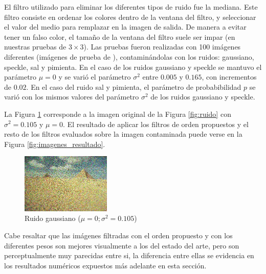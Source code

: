El filtro utilizado para eliminar los diferentes tipos de ruido fue la mediana. Este filtro consiste en ordenar los colores dentro de la ventana del filtro, y seleccionar el valor del medio para remplazar en la imagen de salida. De manera a evitar tener un falso color, el tama\~no de la ventana del filtro suele ser impar (en nuestras pruebas de $3\times 3$). Las pruebas fueron realizadas con 100 im\'agenes diferentes (im\'agenes de prueba de \cite{arbelaez2007berkeley}), contaminándolas con los ruidos: gaussiano, speckle, sal y pimienta. En el caso de los ruidos gaussiano y speckle se mantuvo el parámetro $\mu = 0$ y se varió el parámetro $\sigma^2$ entre $0.005$ y $0.165$, con incrementos de $0.02$. En el caso del ruido sal y pimienta, el parámetro de probabibilidad $p$ se varió con los mismos valores del parámetro $\sigma^2$ de los ruidos gaussiano y speckle.

La Figura \ref{fig:imagen_ejemplo_ruido_gaussiano} corresponde a la imagen original de la Figura \ref{fig:ruido} con $\sigma^2 = 0.105$ y $\mu = 0$. El resultado de aplicar los filtros de orden propuestos y el resto de los filtros evaluados sobre la imagen contaminada puede verse en la Figura \ref{fig:imagenes_resultado}.


\begin{figure}
	\centering
	\includegraphics[width=0.38\textwidth]{fig/img_ruido_gaussian_83_0_105}
	\caption{Ruido gaussiano ($\mu = 0; \sigma^2 = 0.105$)}
	\label{fig:imagen_ejemplo_ruido_gaussiano}
\end{figure}


Cabe resaltar que las imágenes filtradas con el orden propuesto y con los diferentes pesos son mejores visualmente a los del estado del arte, pero son perceptualmente muy parecidas entre si, la diferencia entre ellas se evidencia en los resultados numéricos expuestos más adelante en esta sección.

